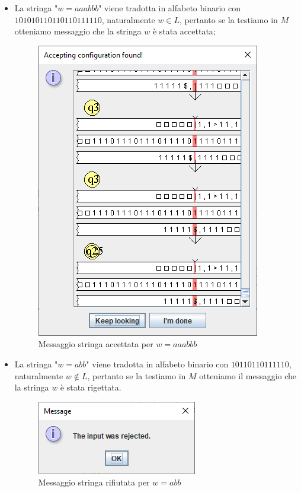 \documentclass[a4paper,12pt,titlepage,oneside]{book}
\begin{document}
\begin{itemize}
	\item La stringa "$w = aaabbb$" viene tradotta in alfabeto binario con \\$101010110110110111110$, naturalmente $w \in L$, pertanto se la testiamo in $M$ otteniamo messaggio che la stringa $w$ è stata accettata;
	
			\begin{figure}[!ht]
				\centering
				\includegraphics[width=.4\textwidth]{Images/test_1_linguaggio_2.png}
				\caption{Messaggio stringa accettata per $w = aaabbb$}
				\label{fig:test_1_linguaggio_2}
			\end{figure}
	
	\item La stringa "$w = abb$" viene tradotta in alfabeto binario con $10110110111110$, naturalmente $w \not\in L$, pertanto se la testiamo in $M$ otteniamo il messaggio che la stringa $w$ è stata rigettata.
	
		\begin{figure}[!ht]
			\centering
			\includegraphics[width=.4\textwidth]{Images/test_errore_linguaggio.png}
			\caption{Messaggio stringa rifiutata per $w = abb$}
			\label{fig:test_2_errore_linguaggio_2}
		\end{figure}
		
\end{itemize}
\end{document}
